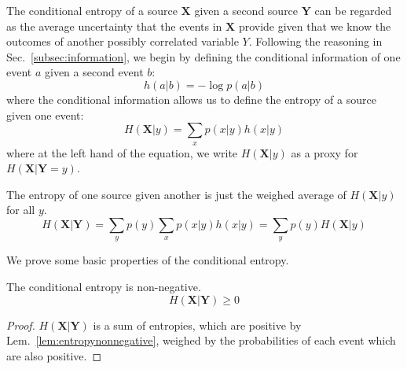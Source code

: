 %
%


The conditional entropy of a source $\mathbf X$ given a second source $\mathbf Y$ can be regarded as the average uncertainty that the events in $\mathbf X$ provide given that we know the outcomes of another possibly correlated variable $Y$. Following the reasoning in Sec.~\ref{subsec:information}, we begin by defining the conditional information of one event $a$ given a second event $b$:
\begin{equation}
h(a|b) = -\log p (a|b)
\end{equation}
\noindent where the conditional information allows us to define the entropy of a source given one event:
\begin{equation}
H(\mathbf{X}|y) = \sum_x p(x|y) h(x|y)
\end{equation}
\noindent where at the left hand of the equation, we write $H(\mathbf{X}|y)$ as a proxy for $H(\mathbf{X}|\mathbf{Y}=y)$. 

The entropy of one source given another is just the weighed average of $H(\mathbf{X}|y)$ for all $y$.
\begin{equation}
H(\mathbf{X}|\mathbf{Y}) = \sum_y p(y) \sum_x p(x|y) h(x|y) = \sum_y p(y) H(\mathbf{X}|y)
\end{equation}

We prove some basic properties of the conditional entropy.
\begin{lemma}The conditional entropy is non-negative.
\begin{equation*}
H(\mathbf{X}|\mathbf{Y}) \geq 0
\end{equation*}
\end{lemma}
\begin{proof}
$H(\mathbf{X}|\mathbf{Y})$ is a sum of entropies, which are positive by Lem.~\ref{lem:entropynonnegative}, weighed by the probabilities of each event which are also positive.
\end{proof}

